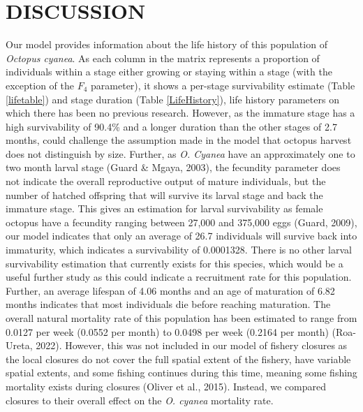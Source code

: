 \documentclass[
]{article}
\begin{document}
\hypertarget{discussion}{%
\section{DISCUSSION}\label{discussion}}

Our model provides information about the life history of this population of \emph{Octopus cyanea}. As each column in the matrix represents a proportion of individuals within a stage either growing or staying within a stage (with the exception of the \(F_4\) parameter), it shows a per-stage survivability estimate (Table \ref{lifetable}) and stage duration (Table \ref{LifeHistory}), life history parameters on which there has been no previous research. However, as the immature stage has a high survivability of 90.4\% and a longer duration than the other stages of 2.7 months, could challenge the assumption made in the model that octopus harvest does not distinguish by size. Further, as \emph{O. Cyanea} have an approximately one to two month larval stage (Guard \& Mgaya, 2003), the fecundity parameter does not indicate the overall reproductive output of mature individuals, but the number of hatched offspring that will survive its larval stage and back the immature stage. This gives an estimation for larval survivability as female octopus have a fecundity ranging between 27,000 and 375,000 eggs (Guard, 2009), our model indicates that only an average of 26.7 individuals will survive back into immaturity, which indicates a survivability of 0.0001328. There is no other larval survivability estimation that currently exists for this species, which would be a useful further study as this could indicate a recruitment rate for this population. Further, an average lifespan of 4.06 months and an age of maturation of 6.82 months indicates that most individuals die before reaching maturation. The overall natural mortality rate of this population has been estimated to range from 0.0127 per week (0.0552 per month) to 0.0498 per week (0.2164 per month) (Roa-Ureta, 2022). However, this was not included in our model of fishery closures as the local closures do not cover the full spatial extent of the fishery, have variable spatial extents, and some fishing continues during this time, meaning some fishing mortality exists during closures (Oliver et al., 2015). Instead, we compared closures to their overall effect on the \emph{O. cyanea} mortality rate.
\end{document}
